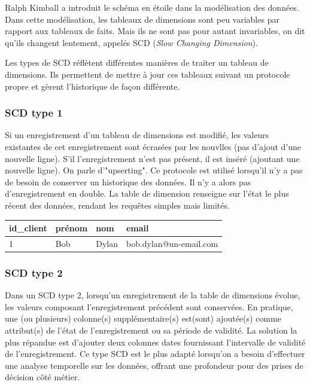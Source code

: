 \documentclass[11pt]{article}
\renewcommand{\emph}[1]{\textsl{#1}}
\begin{document}
Ralph Kimball a introduit le schéma en étoile dans la modélisation
des données. Dans cette modélisation, les tableaux de dimensions sont
peu variables par rapport aux tableaux de faits. Mais ils ne sont
pas pour autant invariables, on dit qu'ils changent lentement, appelés SCD (\emph{Slow Changing Dimension}).

Les types de SCD réflètent différentes manières de traiter un tableau
de dimensions. Ils permettent de mettre à jour ces tableaux suivant un protocole propre et gèrent l'historique de façon différente.

\subsubsection*{SCD type 1}

Si un enregistrement d'un tableau de dimensions est modifié,
les valeurs existantes de cet enregistrement sont écrasées par les nouvlles (pas d'ajout d'une nouvelle ligne). S'il l'enregistrement n'est pas présent, il est inséré (ajoutant une nouvelle ligne). On parle d'"upserting". Ce protocole est utilisé lorsqu'il n'y a pas de besoin de conserver un historique des données. Il n'y a alors pas d'enregistrement en double. La table de dimension renseigne
sur l'état le plus récent des données, rendant les requêtes simples mais limités.

\noindent \begin{tabularx}{\linewidth}{|l|l|l|L|}
    \hline
    id\_client & prénom & nom   & email                  \\
              & Bob    & Dylan & bob.dylan@un-email.com \\
    \hline
\end{tabularx}


\subsubsection*{SCD type 2}

Dans un SCD type 2, lorsqu'un enregistrement de la table de dimensions évolue, les valeurs composant l'enregistrement précédent sont conservées. En pratique, une (ou plusieurs) colonne(s) supplémentaire(s) est(sont) ajoutée(s) comme attribut(s) de l'état de l'enregistrement ou sa période de validité. La solution la plus répandue est d'ajouter deux colonnes dates fournissant l'intervalle de validité de l'enregistrement. Ce type SCD est le plus adapté lorsqu'on a besoin d'effectuer une analyse temporelle sur les données, offrant une profondeur pour des prises de décision côté métier.
\end{document}
